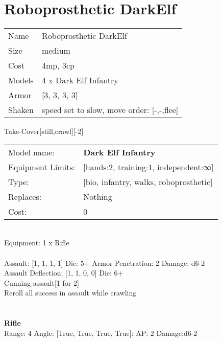 \pagebreak\pagebreak

\section{ Roboprosthetic DarkElf }

\begin{tabular}{ll}
  Name & Roboprosthetic DarkElf \\
  Size & medium\\
  Cost & 4mp, 3cp\\
  Models & 4 x Dark Elf Infantry\\
  Armor & [3, 3, 3, 3]\\
  Shaken & speed set to slow, move order: [-,-,flee]\\
\end{tabular}

\noindent Take-Cover[still,crawl][-2]\\ 


\noindent
\begin{tabular}{ll}
Model name: &{\bf Dark Elf Infantry } \\
Equipment Limits: &[hands:2, training:1, independent:∞] \\
Type: &[bio, infantry, walks, roboprosthetic] \\
Replaces: &Nothing \\
Cost: & 0\\
\end{tabular}
\ \\
Equipment: 1 x Rifle \\
\ \\
Assault: [1, 1, 1, 1] Die: 5+ Armor Penetration: 2 Damage: d6-2 \\
Assault Deflection: [1, 1, 0, 0] Die: 6+\\
\indent Cunning assault[1 for 2]\\ 
Reroll all success in assault while crawling\\ 
 
\ \\

\ \\
{\bf Rifle } \\



Range: 4  Angle: [True, True, True, True]: AP: 2 Damage:d6-2 \\




 
\ \\




